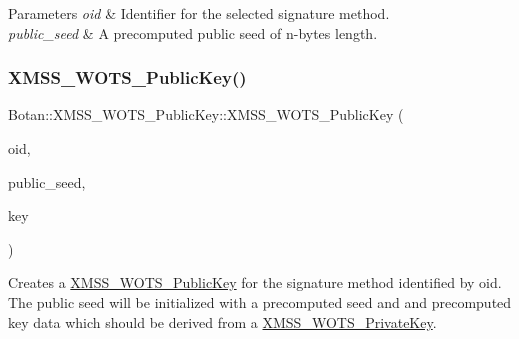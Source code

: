\begin{DoxyParams}{Parameters}
{\em oid} & Identifier for the selected signature method. \\
\hline
{\em public\+\_\+seed} & A precomputed public seed of n-\/bytes length. \\
\hline
\end{DoxyParams}
\mbox{\label{class_botan_1_1_x_m_s_s___w_o_t_s___public_key_a107a21510470543ddb752834e8f08594}} 
\subsubsection{\texorpdfstring{X\+M\+S\+S\+\_\+\+W\+O\+T\+S\+\_\+\+Public\+Key()}{XMSS\_WOTS\_PublicKey()}\hspace{0.1cm}{\footnotesize\ttfamily [4/6]}}
{\footnotesize\ttfamily Botan\+::\+X\+M\+S\+S\+\_\+\+W\+O\+T\+S\+\_\+\+Public\+Key\+::\+X\+M\+S\+S\+\_\+\+W\+O\+T\+S\+\_\+\+Public\+Key (\begin{DoxyParamCaption}\item[{X\+M\+S\+S\+\_\+\+W\+O\+T\+S\+\_\+\+Parameters\+::ots\+\_\+algorithm\+\_\+t}]{oid,  }\item[{secure\+\_\+vector$<$ uint8\+\_\+t $>$ \&\&}]{public\+\_\+seed,  }\item[{wots\+\_\+keysig\+\_\+t \&\&}]{key }\end{DoxyParamCaption})\hspace{0.3cm}{\ttfamily [inline]}}

Creates a \hyperlink{class_botan_1_1_x_m_s_s___w_o_t_s___public_key}{X\+M\+S\+S\+\_\+\+W\+O\+T\+S\+\_\+\+Public\+Key} for the signature method identified by oid. The public seed will be initialized with a precomputed seed and and precomputed key data which should be derived from a \hyperlink{class_botan_1_1_x_m_s_s___w_o_t_s___private_key}{X\+M\+S\+S\+\_\+\+W\+O\+T\+S\+\_\+\+Private\+Key}.


